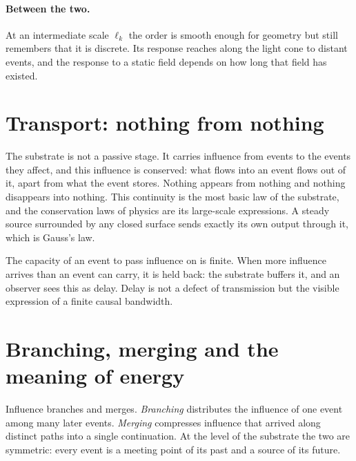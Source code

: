 \paragraph{Between the two.} At an intermediate scale $\ell_k$ the order is smooth enough for
geometry but still remembers that it is discrete. Its response reaches along the light cone to
distant events, and the response to a static field depends on how long that field has existed.

\section{Transport: nothing from nothing}\label{sec:onto-transport}

The substrate is not a passive stage. It carries influence from events to the events they affect,
and this influence is conserved: what flows into an event flows out of it, apart from what the event
stores. Nothing appears from nothing and nothing disappears into nothing. This continuity is the
most basic law of the substrate, and the conservation laws of physics are its large-scale
expressions. A steady source surrounded by any closed surface sends exactly its own output through
it, which is Gauss's law. 

The capacity of an event to pass influence on is finite. When more influence arrives than an event
can carry, it is held back: the substrate buffers it, and an observer sees this as delay. Delay is
not a defect of transmission but the visible expression of a finite causal bandwidth.

\section{Branching, merging and the meaning of energy}\label{sec:onto-merging}

Influence branches and merges. \emph{Branching} distributes the influence of one event among many
later events. \emph{Merging} compresses influence that arrived along distinct paths into a single
continuation. At the level of the substrate the two are symmetric: every event is a meeting point of
its past and a source of its future. 

